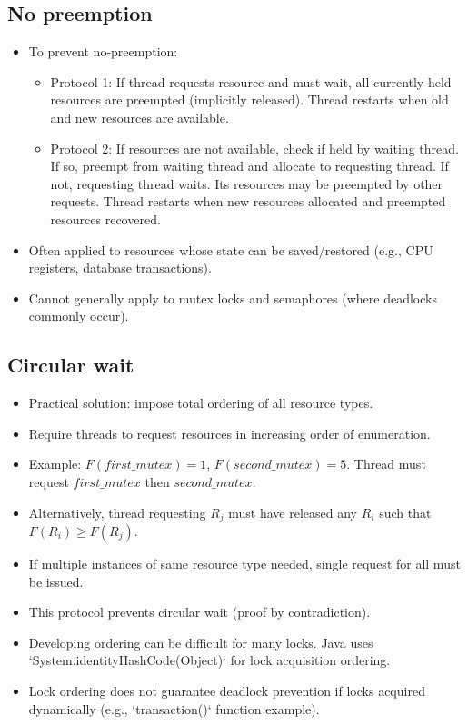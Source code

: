 \subsection*{No preemption}
\begin{itemize}[noitemsep, topsep=0pt]
    \item To prevent no-preemption:
    \begin{itemize}[noitemsep, topsep=0pt]
        \item Protocol 1: If thread requests resource and must wait, all currently held resources are preempted (implicitly released). Thread restarts when old and new resources are available.
        \item Protocol 2: If resources are not available, check if held by waiting thread. If so, preempt from waiting thread and allocate to requesting thread. If not, requesting thread waits. Its resources may be preempted by other requests. Thread restarts when new resources allocated and preempted resources recovered.
    \end{itemize}
    \item Often applied to resources whose state can be saved/restored (e.g., CPU registers, database transactions).
    \item Cannot generally apply to mutex locks and semaphores (where deadlocks commonly occur).
\end{itemize}

\subsection*{Circular wait}
\begin{itemize}[noitemsep, topsep=0pt]
    \item Practical solution: impose total ordering of all resource types.
    \item Require threads to request resources in increasing order of enumeration.
    \item Example: $F(first\_mutex) = 1$, $F(second\_mutex) = 5$. Thread must request $first\_mutex$ then $second\_mutex$.
    \item Alternatively, thread requesting $R_j$ must have released any $R_i$ such that $F(R_i) \ge F(R_j)$.
    \item If multiple instances of same resource type needed, single request for all must be issued.
    \item This protocol prevents circular wait (proof by contradiction).
    \item Developing ordering can be difficult for many locks. Java uses `System.identityHashCode(Object)` for lock acquisition ordering.
    \item Lock ordering does not guarantee deadlock prevention if locks acquired dynamically (e.g., `transaction()` function example).
\end{itemize}

